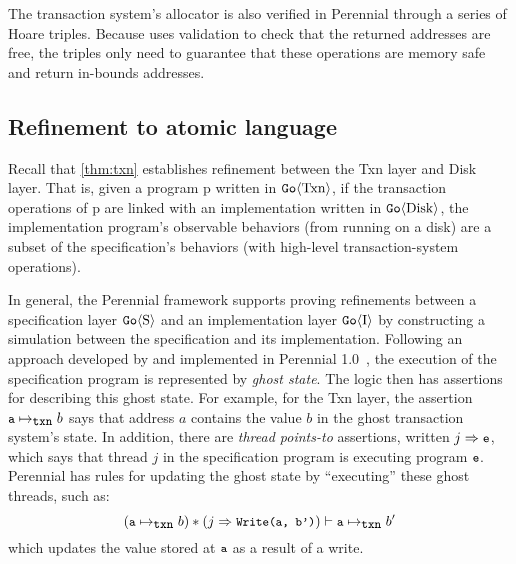 
The transaction system's allocator is also verified in Perennial through a
series of Hoare triples.  Because \sys uses validation to check that the
returned addresses are free, the triples only need to guarantee that these
operations are memory safe and return in-bounds addresses.

\subsection{Refinement to atomic language}

\newcommand{\txnmapsto}{\mapsto_{\cc{txn}}}
\newcommand{\thdmapsto}{\Rightarrow}

Recall that \autoref{thm:txn} establishes refinement between the Txn layer and
Disk layer.  That is, given a program p written in $\mathtt{Go}\langle \mathrm{Txn} \rangle$, if the
transaction operations of p are linked with an implementation written in
$\mathtt{Go}\langle \mathrm{Disk} \rangle$, the implementation program's observable behaviors (from
running on a disk) are a subset of the specification's behaviors (with
high-level transaction-system operations).

In general, the Perennial framework supports proving refinements between a
specification layer $\mathtt{Go}\langle \mathrm{S} \rangle$ and an implementation layer $\mathtt{Go}\langle \mathrm{I} \rangle$ by constructing
a simulation between the specification and its implementation.  Following an
approach developed by \citet{turon:caresl} and implemented in Perennial 1.0~\cite{chajed:perennial}, the execution of the specification
program is represented by \emph{ghost state}. The logic then has assertions for
describing this ghost state.  For example, for the Txn layer, the assertion $\cc{a}
\txnmapsto b$ says that address $a$ contains the value $b$ in the ghost
transaction system's state. In addition, there are \emph{thread points-to}
assertions, written $j \thdmapsto \cc{e}$, which says that thread $j$ in the
specification program is executing program $\cc{e}$. Perennial has rules
for updating the ghost state by ``executing'' these ghost threads, such as:
\[ (\cc{a} \txnmapsto b) \sep (j \thdmapsto \cc{Write(a, b')}) \vdash
\cc{a} \txnmapsto b' \]
which updates the value stored at $\cc{a}$ as a result of a write.

